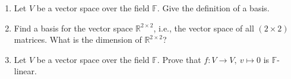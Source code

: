 \vspace*{-0.5cm}
\begin{enumerate}
		\item Let $V$ be a vector space over the field $\mathbb{F}$. Give the definition of a basis.
	\item Find a basis for the vector space $\mathbb{R}^{2 \times 2}$, i.e., the vector space of all $(2 \times 2)$ matrices. What is the dimension of $\mathbb{R}^{2 \times 2}$?
	\item Let $V$ be a vector space over the field $\mathbb{F}$. Prove that $f\colon V \to V,~v\mapsto 0$ is $\mathbb{F}$-linear.
\end{enumerate}
 